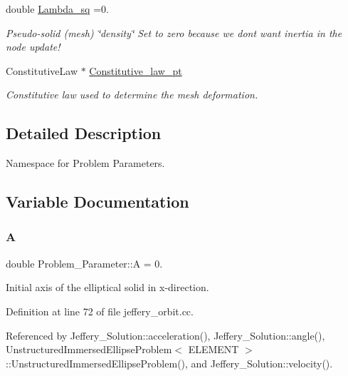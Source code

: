\begin{DoxyCompactItemize}
double \hyperlink{namespaceProblem__Parameter_a20ea33c391abd96d43f79913377c1e12}{Lambda\+\_\+sq} =0.
\begin{DoxyCompactList}\small\item\em Pseudo-\/solid (mesh) \char`\"{}density\char`\"{} Set to zero because we don\textquotesingle{}t want inertia in the node update! \end{DoxyCompactList}\item 
Constitutive\+Law $\ast$ \hyperlink{namespaceProblem__Parameter_a9852a6077458693983628319d429f11f}{Constitutive\+\_\+law\+\_\+pt}
\begin{DoxyCompactList}\small\item\em Constitutive law used to determine the mesh deformation. \end{DoxyCompactList}\end{DoxyCompactItemize}


\subsection{Detailed Description}
Namespace for Problem Parameters. 

\subsection{Variable Documentation}
\mbox{\label{namespaceProblem__Parameter_a23071148de0fea3597c2a7eb848320b6}} 
\subsubsection{\texorpdfstring{A}{A}}
{\footnotesize\ttfamily double Problem\+\_\+\+Parameter\+::A = 0.}



Initial axis of the elliptical solid in x-\/direction. 



Definition at line 72 of file jeffery\+\_\+orbit.\+cc.



Referenced by Jeffery\+\_\+\+Solution\+::acceleration(), Jeffery\+\_\+\+Solution\+::angle(), Unstructured\+Immersed\+Ellipse\+Problem$<$ E\+L\+E\+M\+E\+N\+T $>$\+::\+Unstructured\+Immersed\+Ellipse\+Problem(), and Jeffery\+\_\+\+Solution\+::velocity().

